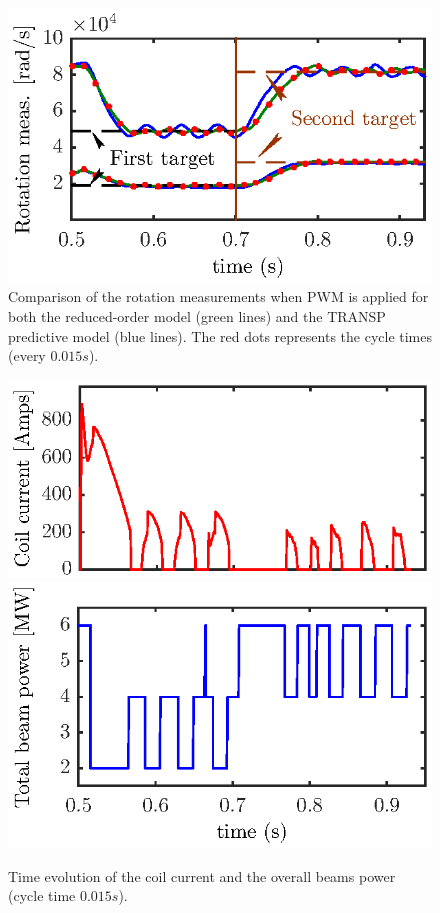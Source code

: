 \documentclass[12pt]{iopart}
\begin{document}
\begin{figure}
	\centering
	\includegraphics{imene_figs/fig17} %
	\caption{Comparison of the rotation measurements when PWM is applied for both the reduced-order model (green lines) and the TRANSP predictive model (blue lines). The red dots represents the cycle times (every $0.015 s$).}
	\label{fig:rot14}
\end{figure}

\begin{figure}
	\centering
	\includegraphics{imene_figs/fig18a}  \\[-0.5em] %
	\includegraphics{imene_figs/fig18b} 
	\caption{Time evolution of the coil current and the overall beams power (cycle time $0.015  s$).}
	\label{fig:rot15}
\end{figure}
\end{document}
